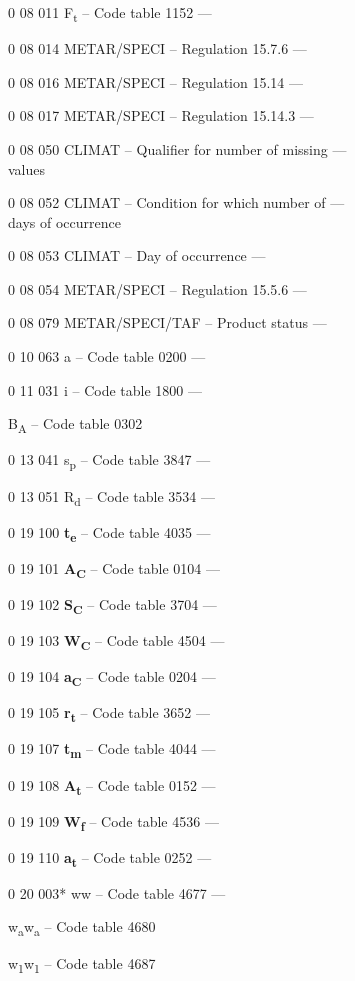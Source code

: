 0 08 011 F\textsubscript{t} -- Code table 1152 ---

0 08 014 METAR/SPECI -- Regulation 15.7.6 ---

0 08 016 METAR/SPECI -- Regulation 15.14 ---

0 08 017 METAR/SPECI -- Regulation 15.14.3 ---

0 08 050 CLIMAT -- Qualifier for number of missing ---\\
values

0 08 052 CLIMAT -- Condition for which number of ---\\
days of occurrence

0 08 053 CLIMAT -- Day of occurrence ---

0 08 054 METAR/SPECI -- Regulation 15.5.6 ---

0 08 079 METAR/SPECI/TAF -- Product status ---

0 10 063 a -- Code table 0200 ---

0 11 031 i -- Code table 1800 ---

B\textsubscript{A} -- Code table 0302

0 13 041 s\textsubscript{p} -- Code table 3847 ---

0 13 051 R\textsubscript{d} -- Code table 3534 ---

0 19 100 \textbf{t\textsubscript{e}} -- Code table 4035 ---

0 19 101 \textbf{A\textsubscript{C}} -- Code table 0104 ---

0 19 102 \textbf{S\textsubscript{C}} -- Code table 3704 ---

0 19 103 \textbf{W\textsubscript{C}} -- Code table 4504 ---

0 19 104 \textbf{a\textsubscript{C}} -- Code table 0204 ---

0 19 105 \textbf{r\textsubscript{t}} -- Code table 3652 ---

0 19 107 \textbf{t\textsubscript{m}} -- Code table 4044 ---

0 19 108 \textbf{A\textsubscript{t}} -- Code table 0152 ---

0 19 109 \textbf{W\textsubscript{f}} -- Code table 4536 ---

0 19 110 \textbf{a\textsubscript{t}} -- Code table 0252 ---

0 20 003* ww -- Code table 4677 ---

w\textsubscript{a}w\textsubscript{a} -- Code table 4680

w\textsubscript{1}w\textsubscript{1} -- Code table 4687

